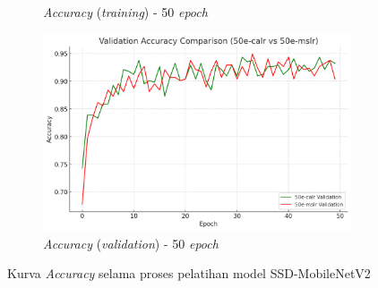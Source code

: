 \begin{figure}[htbp]
\begin{subfigure}{0.45\textwidth}
    \caption{\emph{Accuracy} (\emph{training}) - 50 \emph{epoch}}
  \end{subfigure}
  \hfill
  \begin{subfigure}{0.45\textwidth}
    \includegraphics[width=\textwidth]{gambar/bab4-val-acc-50e.png}
    \caption{\emph{Accuracy} (\emph{validation}) - 50 \emph{epoch}}
  \end{subfigure}
  \caption{Kurva \emph{Accuracy} selama proses pelatihan model SSD-MobileNetV2}
  \label{fig:accuracy_curves}
\end{figure}


